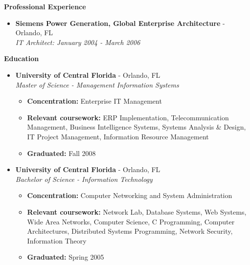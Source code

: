 \documentclass[10pt,oneside]{article}
\newenvironment{ressection}[1]{
	\vspace{4pt}
	\textbf{\selectfont\normalsize#1}
	\begin{itemize}
	\vspace{3pt}
}{
	\end{itemize}
}
\newcommand{\ressubitem}[1]{
	\vspace{-1pt}
	\item \begin{flushleft} #1 \end{flushleft}
}
\newcommand{\resbigitem}[3]{
	\vspace{-5pt}
	\item
	\textbf{#1} - #2 \\
	\textit{#3}
}
\newenvironment{ressubsec}[3]{
	\resbigitem{#1}{#2}{#3}
	\vspace{-2pt}
	\begin{itemize}
}{
	\end{itemize}
}
\begin{document}
\begin{ressection}{Professional Experience}
\begin{ressubsec}{Siemens Power Generation, Global Enterprise Architecture}{Orlando, FL}{IT Architect: January 2004 - March 2006}
	\end{ressubsec}







\end{ressection}


\begin{ressection}{Education}

	\begin{ressubsec}{University of Central Florida}{Orlando, FL}{Master of Science - Management Information Systems}

		\ressubitem{\textbf{Concentration:} Enterprise IT Management}
		
		\ressubitem{\textbf{Relevant coursework:} ERP Implementation, Telecommunication Management, Business Intelligence Systems, Systems Analysis \& Design, IT Project Management, Information Resource Management}

		\ressubitem{\textbf{Graduated:} Fall 2008}

	\end{ressubsec}

	\begin{ressubsec}{University of Central Florida}{Orlando, FL}{Bachelor of Science - Information Technology}

		\ressubitem{\textbf{Concentration:} Computer Networking and System Administration}
		
		\ressubitem{\textbf{Relevant coursework:} Network Lab, Database Systems, Web Systems, Wide Area Networks, Computer Science, C Programming, Computer Architectures, Distributed Systems Programming, Network Security, Information Theory}

		\ressubitem{\textbf{Graduated:} Spring 2005}

	\end{ressubsec}

\end{ressection}
\end{document}
